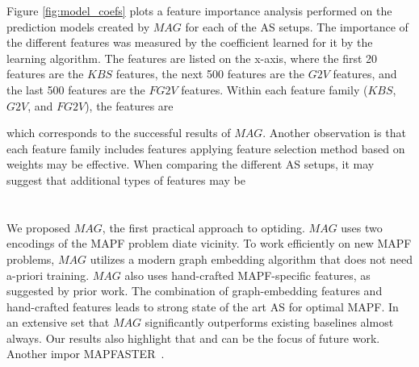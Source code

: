\documentclass[letterpaper]{article} %
\newcommand{\Carmel}[1]{}
\newcommand{\Roni}[1]{}
\newcommand{\gtv}[1]{\ensuremath{\textit{G2V}}\xspace}
\newcommand{\fgtv}[1]{\ensuremath{\textit{FG2V}}\xspace}
\newcommand{\kaduri}[1]{\ensuremath{\textit{KBS}}\xspace}
\newcommand{\mapfgas}[1]{\ensuremath{\textit{MAG}}\xspace}
\begin{document}
Figure \ref{fig:model_coefs} plots a feature importance analysis performed on the prediction models created by \mapfgas\ for each of the AS setups.
The importance of the different features was measured by the coefficient learned for it by the learning algorithm.
The features are listed on the x-axis, where the first 20 features are the \kaduri\ features, the next 500 features are the \gtv\ features, and the last 500 features are the \fgtv\ features. Within each feature family (\kaduri\ ,\gtv\ , and \fgtv\ ), the features are 


   which corresponds to the successful results of \mapfgas\ .
Another observation is that each feature family includes features  applying feature selection method based on weights may be effective.
When comparing the different AS setups, it    may suggest that additional types of features  may be 

\section{}
We proposed \mapfgas\ , the first practical approach to optiding.
\mapfgas\ uses two encodings of the MAPF problem  diate vicinity.
To work efficiently on new MAPF problems, \mapfgas\ utilizes a modern graph embedding algorithm that does not need a-priori training.
\mapfgas\ also uses hand-crafted MAPF-specific features, as suggested by prior work.
The combination of graph-embedding features and hand-crafted features leads to strong state of the art AS for optimal MAPF.
In an extensive set  that \mapfgas\ significantly outperforms existing baselines almost always.
Our results also highlight that  and can be the focus of future work.
Another impor  MAPFASTER~\cite{alkazzi2022mapfaster}.



\clearpage

\end{document}
